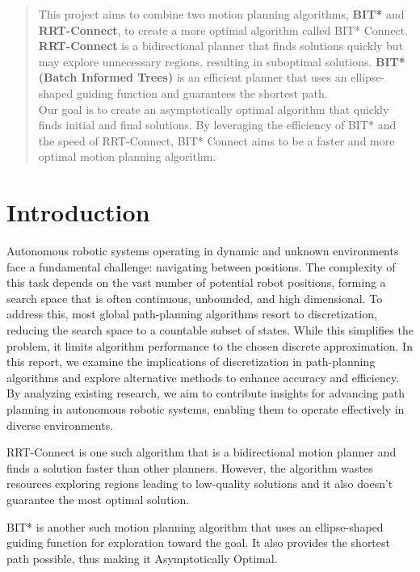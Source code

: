 \documentclass[12pt]{report}
\begin{document}
\begin{abstract}
  This project aims to combine two motion planning algorithms, \textbf{BIT*} and \textbf{RRT-Connect}, to create a more optimal algorithm called BIT* Connect.\\
  \textbf{RRT-Connect} is a bidirectional planner that finds solutions quickly but may explore unnecessary regions, resulting in suboptimal solutions. \textbf{BIT*(Batch Informed Trees)} is an efficient planner that uses an ellipse-shaped guiding function and guarantees the shortest path.\\
  Our goal is to create an asymptotically optimal algorithm that quickly finds initial and final solutions. By leveraging the efficiency of BIT* and the speed of RRT-Connect, BIT* Connect aims to be a faster and more optimal motion planning algorithm.
\end{abstract}

\tableofcontents

\chapter{Introduction}
Autonomous robotic systems operating in dynamic and unknown environments face a fundamental challenge: navigating between positions. The complexity of this task depends on the vast number of potential robot positions, forming a search space that is often continuous, unbounded, and high dimensional. To address this, most global path-planning algorithms resort to discretization, reducing the search space to a countable subset of states. While this simplifies the problem, it limits algorithm performance to the chosen discrete approximation. In this report, we examine the implications of discretization in path-planning algorithms and explore alternative methods to enhance accuracy and efficiency. By analyzing existing research, we aim to contribute insights for advancing path planning in autonomous robotic systems, enabling them to operate effectively in diverse environments.


RRT-Connect is one such algorithm that is a bidirectional motion planner and finds a solution faster than other planners. However, the algorithm wastes resources exploring regions leading to low-quality solutions and it also doesn’t guarantee the most optimal solution. 


BIT* is another such motion planning algorithm that uses an ellipse-shaped guiding function for exploration toward the goal. It also provides the shortest path possible, thus making it Asymptotically Optimal.
\end{document}
